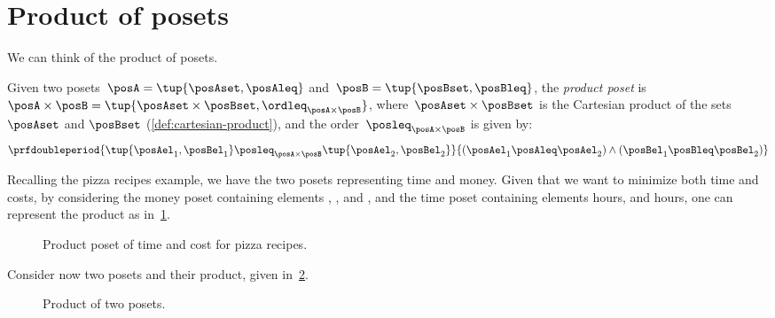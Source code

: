 
\section{Product of posets}
We can think of the product of posets.

\begin{definition}
    \label{def:productposet}
    Given two posets~$\posA=\tup{\posAset, \posAleq}$
    and~$\posB=\tup{\posBset, \posBleq}$, the \emph{product poset} is~$\posA\times \posB=\tup{\posAset \times \posBset, \ordleq_{\posA\times \posB}}$, where~$\posAset \times \posBset$ is the Cartesian product of the sets~$\posAset$ and $\posBset$ (\cref{def:cartesian-product}), and the order~$\posleq_{\posA \times \posB}$ is given by:
    \begin{equation}
        \prfdoubleperiod{\tup{\posAel_1, \posBel_1}
            \posleq_{\posA\times \posB}
            \tup{\posAel_2, \posBel_2}}{(\posAel_1 \posAleq \posAel_2) \wedge
            (\posBel_1 \posBleq \posBel_2)}
    \end{equation}
\end{definition}
Recalling the pizza recipes example, we have the two posets representing time and money.
Given that we want to minimize both time and costs, by considering the money poset containing elements \unit[10]{\CHF}, \unit[20]{\CHF}, and \unit[30]{\CHF}, and the time poset containing elements \unit[1]{hours}, and \unit[2]{hours}, one can represent the product as in~\cref{fig:productpizza}.

\begin{figure}[h!]
    \centering
    \caption{Product poset of time and cost for pizza recipes.}
    \label{fig:productpizza}
\end{figure}

\begin{example}
    Consider now two posets and their product, given in~\cref{fig:composing_posets_1}.
    \begin{figure}[h!]
        \centering
        \caption{Product of two posets.}
        \label{fig:composing_posets_1}
    \end{figure}
\end{example}
